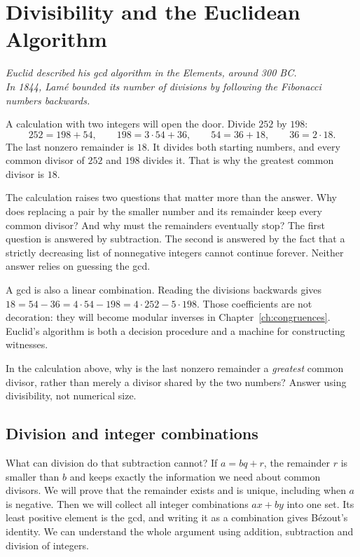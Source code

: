 \chapter{Divisibility and the Euclidean Algorithm}\label{ch:divisibility}

\begin{center}\itshape
Euclid described his gcd algorithm in the \emph{Elements}, around 300 BC.\\
In 1844, Lam\'e bounded its number of divisions by following the Fibonacci numbers backwards.
\end{center}


A calculation with two integers will open the door. Divide $252$ by $198$:
\[
252=198+54,\qquad 198=3\cdot54+36,\qquad
54=36+18,\qquad36=2\cdot18.
\]
The last nonzero remainder is $18$. It divides both starting numbers, and every common divisor of $252$ and $198$ divides it. That is why the greatest common divisor is $18$.

The calculation raises two questions that matter more than the answer. Why does replacing a pair by the smaller number and its remainder keep every common divisor? And why must the remainders eventually stop? The first question is answered by subtraction. The second is answered by the fact that a strictly decreasing list of nonnegative integers cannot continue forever. Neither answer relies on guessing the gcd.

A gcd is also a linear combination. Reading the divisions backwards gives $18=54-36=4\cdot54-198=4\cdot252-5\cdot198$. Those coefficients are not decoration: they will become modular inverses in Chapter~\ref{ch:congruences}. Euclid's algorithm is both a decision procedure and a machine for constructing witnesses.

\begin{think}
In the calculation above, why is the last nonzero remainder a \emph{greatest} common divisor, rather than merely a divisor shared by the two numbers? Answer using divisibility, not numerical size.
\end{think}


\section{Division and integer combinations}

What can division do that subtraction cannot? If $a=bq+r$, the remainder $r$ is smaller than $b$ and keeps exactly the information we need about common divisors. We will prove that the remainder exists and is unique, including when $a$ is negative. Then we will collect all integer combinations $ax+by$ into one set. Its least positive element is the gcd, and writing it as a combination gives B\'ezout's identity. We can understand the whole argument using addition, subtraction and division of integers.


